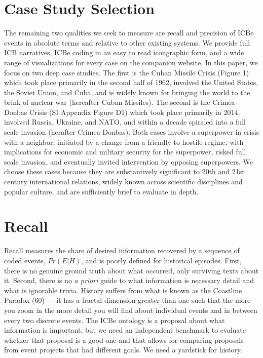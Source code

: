 \documentclass[9pt,twocolumn,twoside,lineno]{pnas-new}
\begin{document}
\hypertarget{case-study-selection}{%
\section*{Case Study Selection}\label{case-study-selection}}

The remaining two qualities we seek to measure are recall and precision
of ICBe events in absolute terms and relative to other existing systems.
We provide full ICB narratives, ICBe coding in an easy to read
icongraphic form, and a wide range of visualizations for every case on
the companion website. In this paper, we focus on two deep case studies.
The first is the Cuban Missile Crisis (Figure 1) which took place
primarily in the second half of 1962, involved the United States, the
Soviet Union, and Cuba, and is widely known for bringing the world to
the brink of nuclear war (hereafter Cuban Missiles). The second is the
Crimea-Donbas Crisis (SI Appendix Figure D1) which took place primarily
in 2014, involved Russia, Ukraine, and NATO, and within a decade
spiraled into a full scale invasion (herafter Crimea-Donbas). Both cases
involve a superpower in crisis with a neighbor, initiated by a change
from a friendly to hostile regime, with implications for economic and
military security for the superpower, risked full scale invasion, and
eventually invited intervention by opposing superpowers. We choose these
cases because they are substantively significant to 20th and 21st
century international relations, widely known across scientific
disciplines and popular culture, and are sufficiently brief to evaluate
in depth.

\hypertarget{recall}{%
\section*{Recall}\label{recall}}

Recall measures the share of desired information recovered by a sequence
of coded events, \(Pr(E|H)\), and is poorly defined for historical
episodes. First, there is no genuine ground truth about what occurred,
only surviving texts about it. Second, there is no \textit{a priori}
guide to what information is necessary detail and what is ignorable
trivia. History suffers from what is known as the Coastline Paradox (60)
--- it has a fractal dimension greater than one such that the more you
zoom in the more detail you will find about individual events and in
between every two discrete events. The ICBe ontology is a proposal about
what information is important, but we need an independent benchmark to
evaluate whether that proposal is a good one and that allows for
comparing proposals from event projects that had different goals. We
need a yardstick for history.
\end{document}
